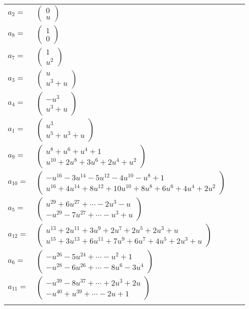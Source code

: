 \documentclass[1p]{elsarticle_modified}
\theoremstyle{definition}
\begin{document}
\begin{tabular}{m{7pt} m{180pt} m{7pt} m{180pt} }
\flushright $a_{2}=$&$\begin{pmatrix}0\\u\end{pmatrix}$ \\
\flushright $a_{8}=$&$\begin{pmatrix}1\\0\end{pmatrix}$ \\
\flushright $a_{7}=$&$\begin{pmatrix}1\\u^2\end{pmatrix}$ \\
\flushright $a_{3}=$&$\begin{pmatrix}u\\u^3+u\end{pmatrix}$ \\
\flushright $a_{4}=$&$\begin{pmatrix}- u^3\\u^3+u\end{pmatrix}$ \\
\flushright $a_{1}=$&$\begin{pmatrix}u^3\\u^5+u^3+u\end{pmatrix}$ \\
\flushright $a_{9}=$&$\begin{pmatrix}u^8+u^6+u^4+1\\u^{10}+2 u^8+3 u^6+2 u^4+u^2\end{pmatrix}$ \\
\flushright $a_{10}=$&$\begin{pmatrix}- u^{16}-3 u^{14}-5 u^{12}-4 u^{10}- u^8+1\\u^{16}+4 u^{14}+8 u^{12}+10 u^{10}+8 u^8+6 u^6+4 u^4+2 u^2\end{pmatrix}$ \\
\flushright $a_{5}=$&$\begin{pmatrix}u^{29}+6 u^{27}+\cdots-2 u^3- u\\- u^{29}-7 u^{27}+\cdots- u^3+u\end{pmatrix}$ \\
\flushright $a_{12}=$&$\begin{pmatrix}u^{13}+2 u^{11}+3 u^9+2 u^7+2 u^5+2 u^3+u\\u^{15}+3 u^{13}+6 u^{11}+7 u^9+6 u^7+4 u^5+2 u^3+u\end{pmatrix}$ \\
\flushright $a_{6}=$&$\begin{pmatrix}- u^{26}-5 u^{24}+\cdots- u^2+1\\- u^{28}-6 u^{26}+\cdots-8 u^6-3 u^4\end{pmatrix}$ \\
\flushright $a_{11}=$&$\begin{pmatrix}- u^{39}-8 u^{37}+\cdots+2 u^3+2 u\\- u^{40}+u^{39}+\cdots-2 u+1\end{pmatrix}$\\&\end{tabular}
\end{document}
